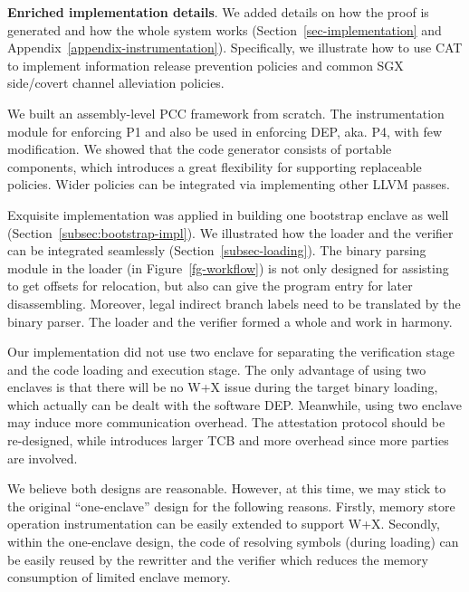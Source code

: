 \vspace{3pt}\noindent\textbf{Enriched implementation details}.
We added details on how the proof is generated and how the whole system works (Section~\ref{sec-implementation} and Appendix~\ref{appendix-instrumentation}). Specifically, we illustrate how to use CAT to implement information release prevention policies and common SGX side/covert channel alleviation policies. 

We built an assembly-level PCC framework from scratch. The instrumentation module for enforcing P1 and also be used in enforcing DEP, aka. P4, with few modification.
We showed that the code generator consists of portable components, which introduces a great flexibility for supporting replaceable policies. Wider policies can be integrated via implementing other LLVM passes.

Exquisite implementation was applied in building one bootstrap enclave as well (Section~\ref{subsec:bootstrap-impl}). We illustrated how the loader and the verifier can be integrated seamlessly (Section~\ref{subsec-loading}). The binary parsing module in the loader (in Figure~\ref{fg-workflow}) is  not only designed for assisting to get offsets for relocation, but also can give the program entry for later disassembling. Moreover, legal indirect branch labels need to be translated by the binary parser. The loader and the verifier formed a whole and work in harmony.

Our implementation did not use two enclave for separating the verification stage and the code loading and execution stage. The only advantage of using two enclaves is that there will be no W+X issue during the target binary loading, which actually can be dealt with the software DEP. Meanwhile, using two enclave may induce more communication overhead. The attestation protocol should be re-designed, while introduces larger TCB and more overhead since more parties are involved.

We believe both designs are reasonable. However, at this time, we may stick to the original ``one-enclave'' design for the following reasons. Firstly, memory store operation instrumentation can be easily extended to support W+X. Secondly, within the one-enclave design, the code of resolving symbols (during loading) can be easily reused by the rewritter and the verifier which reduces the memory consumption of limited enclave memory. 


